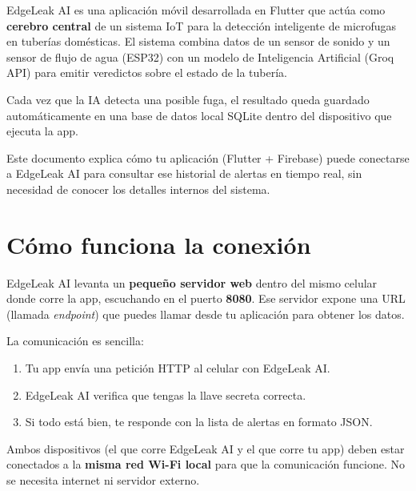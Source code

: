 \documentclass[12pt, a4paper]{article}
\begin{document}
EdgeLeak AI es una aplicación móvil desarrollada en Flutter que actúa como
\textbf{cerebro central} de un sistema IoT para la detección inteligente de
microfugas en tuberías domésticas. El sistema combina datos de un sensor de
sonido y un sensor de flujo de agua (ESP32) con un modelo de Inteligencia
Artificial (Groq API) para emitir veredictos sobre el estado de la tubería.

Cada vez que la IA detecta una posible fuga, el resultado queda guardado
automáticamente en una base de datos local SQLite dentro del dispositivo que
ejecuta la app.

\begin{tcolorbox}[infobox]
  Este documento explica cómo tu aplicación (Flutter + Firebase) puede
  conectarse a EdgeLeak AI para consultar ese historial de alertas en tiempo
  real, sin necesidad de conocer los detalles internos del sistema.
\end{tcolorbox}

\section{Cómo funciona la conexión}

EdgeLeak AI levanta un \textbf{pequeño servidor web} dentro del mismo celular
donde corre la app, escuchando en el puerto \textbf{8080}. Ese servidor expone
una URL (llamada \emph{endpoint}) que puedes llamar desde tu aplicación para
obtener los datos.

La comunicación es sencilla:

\begin{enumerate}[leftmargin=*, label=\textbf{\arabic*.}]
  \item Tu app envía una petición HTTP al celular con EdgeLeak AI.
  \item EdgeLeak AI verifica que tengas la llave secreta correcta.
  \item Si todo está bien, te responde con la lista de alertas en formato JSON.
\end{enumerate}

\begin{tcolorbox}[warningbox]
  Ambos dispositivos (el que corre EdgeLeak AI y el que corre tu app) deben
  estar conectados a la \textbf{misma red Wi-Fi local} para que la comunicación
  funcione. No se necesita internet ni servidor externo.
\end{tcolorbox}
\end{document}
